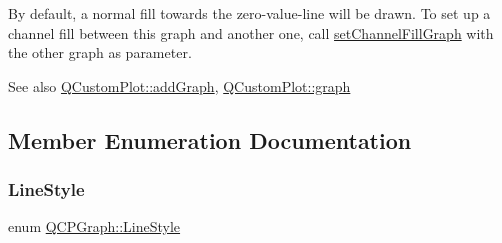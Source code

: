By default, a normal fill towards the zero-\/value-\/line will be drawn. To set up a channel fill between this graph and another one, call \hyperlink{classQCPGraph_a2d03156df1b64037a2e36cfa50351ca3}{set\+Channel\+Fill\+Graph} with the other graph as parameter.

\begin{DoxySeeAlso}{See also}
\hyperlink{classQCustomPlot_a6fb2873d35a8a8089842d81a70a54167}{Q\+Custom\+Plot\+::add\+Graph}, \hyperlink{classQCustomPlot_a6ecae130f684b25276fb47bd3a5875c6}{Q\+Custom\+Plot\+::graph} 
\end{DoxySeeAlso}


\subsection{Member Enumeration Documentation}
\mbox{\label{classQCPGraph_ad60175cd9b5cac937c5ee685c32c0859}} 
\subsubsection{\texorpdfstring{Line\+Style}{LineStyle}}
{\footnotesize\ttfamily enum \hyperlink{classQCPGraph_ad60175cd9b5cac937c5ee685c32c0859}{Q\+C\+P\+Graph\+::\+Line\+Style}}

